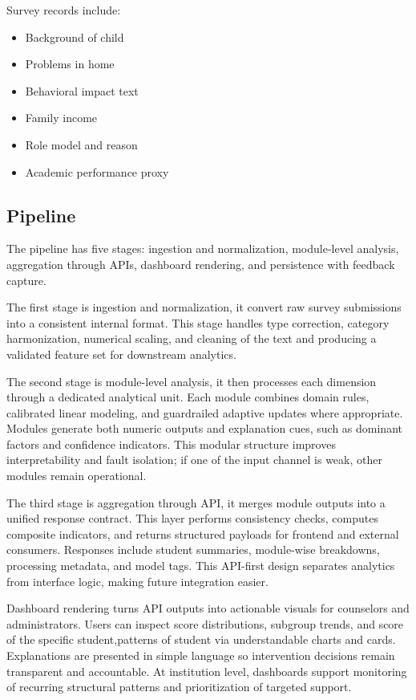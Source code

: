 \documentclass[conference]{IEEEtran}
\begin{document}
Survey records include:
\begin{itemize}
\item Background of child
\item Problems in home
\item Behavioral impact text
\item Family income
\item Role model and reason
\item Academic performance proxy
\end{itemize}


\subsection{Pipeline}
The pipeline has five stages: ingestion and normalization, module-level analysis, aggregation through APIs, dashboard rendering, and persistence with feedback capture.

The first stage is ingestion and normalization, it convert raw survey submissions into a consistent internal format. This stage handles type correction, category harmonization, numerical scaling, and cleaning of the text and producing a validated feature set for downstream analytics.

The second stage is module-level analysis, it then processes each dimension through a dedicated analytical unit. Each module combines domain rules, calibrated linear modeling, and guardrailed adaptive updates where appropriate. Modules generate both numeric outputs and explanation cues, such as dominant factors and confidence indicators. This modular structure improves interpretability and fault isolation; if one of the input channel is weak, other modules remain operational.

The third stage is aggregation through API, it merges module outputs into a unified response contract. This layer performs consistency checks, computes composite indicators, and returns structured payloads for frontend and external consumers. Responses include student summaries, module-wise breakdowns, processing metadata, and model tags. This API-first design separates analytics from interface logic, making future integration easier.

Dashboard rendering turns API outputs into actionable visuals for counselors and administrators. Users can inspect score distributions, subgroup trends, and score of the specific student,patterns of student via understandable charts and cards. Explanations are presented in simple language so intervention decisions remain transparent and accountable. At institution level, dashboards support monitoring of recurring structural patterns and prioritization of targeted support.
\end{document}
